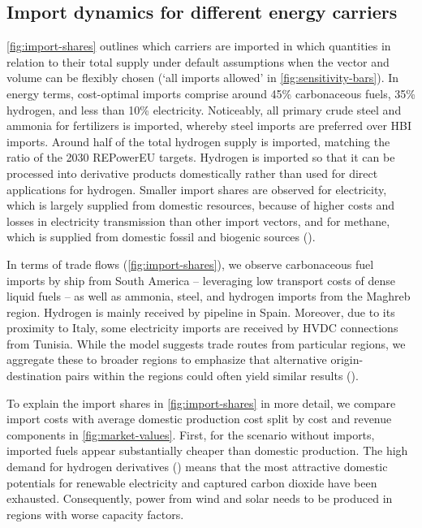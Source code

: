 \subsection*{Import dynamics for different energy carriers}
\label{sec:results-3}


\cref{fig:import-shares} outlines which carriers are imported in which
quantities in relation to their total supply under default assumptions when the
vector and volume can be flexibly chosen (`all imports allowed' in
\cref{fig:sensitivity-bars}). In energy terms, cost-optimal imports comprise
around 45\% carbonaceous fuels, 35\% hydrogen, and less than 10\% electricity.
Noticeably, all primary crude steel and ammonia for fertilizers is imported,
whereby steel imports are preferred over HBI imports. Around half of the total
hydrogen supply is imported, matching the ratio of the 2030 REPowerEU
targets.\cite{europeancommissionRepowerEUPlan} Hydrogen is imported so that it
can be processed into derivative products domestically rather than used for
direct applications for hydrogen. Smaller import shares are observed for
electricity, which is largely supplied from domestic resources, because of
higher costs and losses in electricity transmission than other import vectors,
and for methane, which is supplied from domestic fossil and biogenic sources
().


In terms of trade flows (\cref{fig:import-shares}), we observe carbonaceous fuel
imports by ship from South America -- leveraging low transport costs of dense
liquid fuels -- as well as ammonia, steel, and hydrogen imports from the Maghreb
region. Hydrogen is mainly received by pipeline in Spain. Moreover, due to its
proximity to Italy, some electricity imports are received by HVDC connections
from Tunisia. While the model suggests trade routes from particular regions, we
aggregate these to broader regions to emphasize that alternative
origin-destination pairs within the regions could often yield similar results
().


To explain the import shares in \cref{fig:import-shares} in more detail, we
compare import costs with average domestic production cost split by cost and
revenue components in \cref{fig:market-values}. First, for the scenario without
imports, imported fuels appear substantially cheaper than domestic production.
The high demand for hydrogen derivatives () means that
the most attractive domestic potentials for renewable electricity and captured
carbon dioxide have been exhausted. Consequently, power from wind and solar
needs to be produced in regions with worse capacity factors.

